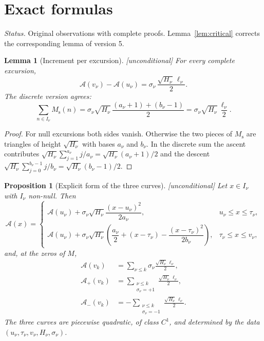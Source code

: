 \documentclass[11pt]{amsart}
\numberwithin{equation}{section}
\theoremstyle{plain}
\newtheorem{proposition}[theorem]{Proposition}
\newtheorem{lemma}[theorem]{Lemma}
\theoremstyle{definition}
\theoremstyle{remark}
\newcommand{\Ms}{M_{\mathrm{s}}}
\newcommand{\Ap}{\mathcal{A}_{+}}
\newcommand{\Am}{\mathcal{A}_{-}}
\newcommand{\Anet}{\mathcal{A}}
\begin{document}
\section{Exact formulas}
\label{sec:formulas}

\noindent\emph{Status.} Original observations with complete proofs.
Lemma~\ref{lem:critical} corrects the corresponding lemma of version 5.

\begin{lemma}[Increment per excursion]
\label{lem:jump}
\emph{[unconditional]} For every complete excursion,
\begin{equation}
\label{eq:jump}
  \Anet(v_\nu)-\Anet(u_\nu)=\sigma_\nu\,\frac{\sqrt{H_\nu}\,\ell_\nu}{2}.
\end{equation}
The discrete version agrees:
\begin{equation}
\label{eq:jump_discrete}
  \sum_{n\in I_\nu}\Ms(n)
  =\sigma_\nu\sqrt{H_\nu}\,\frac{(a_\nu+1)+(b_\nu-1)}{2}
  =\sigma_\nu\sqrt{H_\nu}\,\frac{\ell_\nu}{2}.
\end{equation}
\end{lemma}

\begin{proof}
For null excursions both sides vanish. Otherwise the two pieces of $\Ms$ are
triangles of height $\sqrt{H_\nu}$ with bases $a_\nu$ and $b_\nu$. In the
discrete sum the ascent contributes
$\sqrt{H_\nu}\sum_{j=1}^{a_\nu}j/a_\nu=\sqrt{H_\nu}(a_\nu+1)/2$ and the
descent $\sqrt{H_\nu}\sum_{j=0}^{b_\nu-1}j/b_\nu=\sqrt{H_\nu}(b_\nu-1)/2$.
\end{proof}

\begin{proposition}[Explicit form of the three curves]
\label{prop:explicit}
\emph{[unconditional]} Let $x\in I_\nu$ with $I_\nu$ non-null. Then
\begin{equation}
\label{eq:explicit_A}
  \Anet(x)=
  \begin{cases}
    \Anet(u_\nu)+\sigma_\nu\sqrt{H_\nu}\dfrac{(x-u_\nu)^2}{2a_\nu},
      & u_\nu\le x\le\tau_\nu,\\[2.4ex]
    \Anet(u_\nu)+\sigma_\nu\sqrt{H_\nu}
      \left(\dfrac{a_\nu}{2}+(x-\tau_\nu)-\dfrac{(x-\tau_\nu)^2}{2b_\nu}\right),
      & \tau_\nu\le x\le v_\nu,
  \end{cases}
\end{equation}
and, at the zeros of $M$,
\begin{align}
  \Anet(v_k)&=\sum_{\nu\le k}\sigma_\nu\frac{\sqrt{H_\nu}\,\ell_\nu}{2},
  \label{eq:explicit_net}\\
  \Ap(v_k)&=\sum_{\substack{\nu\le k\\ \sigma_\nu=+1}}\frac{\sqrt{H_\nu}\,\ell_\nu}{2},
  \label{eq:explicit_plus}\\
  \Am(v_k)&=-\sum_{\substack{\nu\le k\\ \sigma_\nu=-1}}\frac{\sqrt{H_\nu}\,\ell_\nu}{2}.
  \label{eq:explicit_minus}
\end{align}
The three curves are piecewise quadratic, of class $C^1$, and determined by
the data $(u_\nu,\tau_\nu,v_\nu,H_\nu,\sigma_\nu)$.
\end{proposition}
\end{document}
